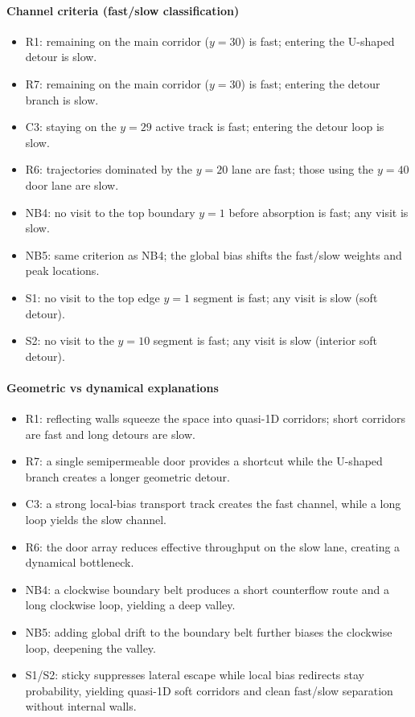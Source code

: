 \documentclass[11pt]{article}
\begin{document}
\paragraph{Channel criteria (fast/slow classification)}
\begin{itemize}
  \item R1: remaining on the main corridor ($y=30$) is fast; entering the U-shaped detour is slow.
  \item R7: remaining on the main corridor ($y=30$) is fast; entering the detour branch is slow.
  \item C3: staying on the $y=29$ active track is fast; entering the detour loop is slow.
  \item R6: trajectories dominated by the $y=20$ lane are fast; those using the $y=40$ door lane are slow.
  \item NB4: no visit to the top boundary $y=1$ before absorption is fast; any visit is slow.
  \item NB5: same criterion as NB4; the global bias shifts the fast/slow weights and peak locations.
  \item S1: no visit to the top edge $y=1$ segment is fast; any visit is slow (soft detour).
  \item S2: no visit to the $y=10$ segment is fast; any visit is slow (interior soft detour).
\end{itemize}

\paragraph{Geometric vs dynamical explanations}
\begin{itemize}
  \item R1: reflecting walls squeeze the space into quasi-1D corridors; short corridors are fast and long detours are slow.
  \item R7: a single semipermeable door provides a shortcut while the U-shaped branch creates a longer geometric detour.
  \item C3: a strong local-bias transport track creates the fast channel, while a long loop yields the slow channel.
  \item R6: the door array reduces effective throughput on the slow lane, creating a dynamical bottleneck.
  \item NB4: a clockwise boundary belt produces a short counterflow route and a long clockwise loop, yielding a deep valley.
  \item NB5: adding global drift to the boundary belt further biases the clockwise loop, deepening the valley.
  \item S1/S2: sticky suppresses lateral escape while local bias redirects stay probability, yielding quasi-1D soft corridors and clean fast/slow separation without internal walls.
\end{itemize}
\end{document}
